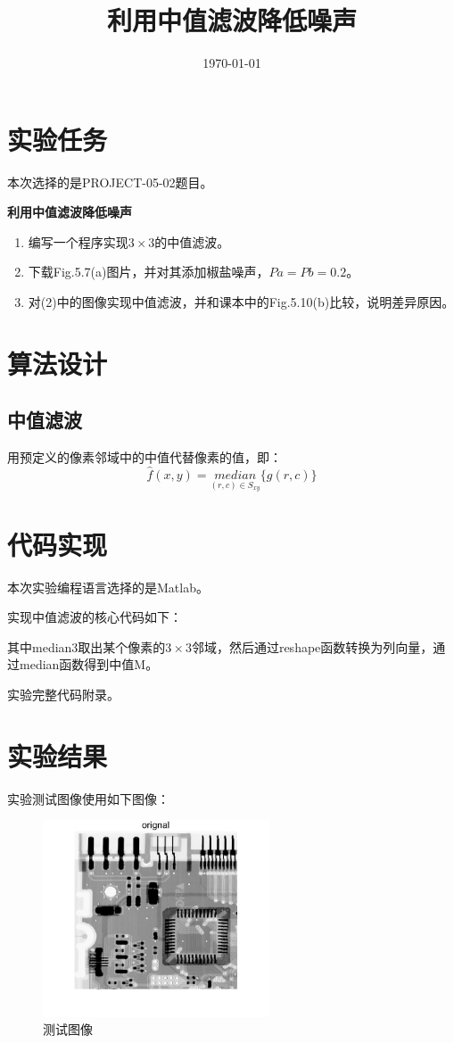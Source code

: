 \documentclass{../source/Experiment}
\title{利用中值滤波降低噪声}
\date{\today}
\begin{document}
    \makecover
    \section{实验任务}
        本次选择的是PROJECT-05-02题目。
        
        \bfseries{利用中值滤波降低噪声}

        \begin{enumerate}
            \item 编写一个程序实现$3 \times 3$的中值滤波。
            \item 下载Fig.5.7(a)图片，并对其添加椒盐噪声，$Pa = Pb = 0.2$。
            \item 对(2)中的图像实现中值滤波，并和课本中的Fig.5.10(b)比较，说明差异原因。
        \end{enumerate}
    \section{算法设计}
        \subsection{中值滤波}
        用预定义的像素邻域中的中值代替像素的值，即：
        $$\hat{f}(x,y) = \underset{(r,c) \in S_{xy}}{median}\{ g(r,c)\}
        $$ 

    \section{代码实现}
        本次实验编程语言选择的是Matlab。

        实现中值滤波的核心代码如下：

        

        其中median3取出某个像素的$3 \times 3$邻域，然后通过reshape函数转换为列向量，通过median函数得到中值M。

        实验完整代码附录。
    \section{实验结果}
        实验测试图像使用如下图像：
        \begin{figure}[H]
            \centering
            \includegraphics[width = 0.6\textwidth]{第二次/f1.png}
            \caption{测试图像}
        \end{figure}
\end{document}
